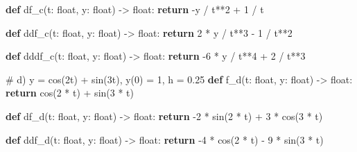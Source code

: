 \documentclass[
  letterpaper,
  DIV=11,
  numbers=noendperiod]{scrartcl}
\newenvironment{Shaded}{\begin{snugshade}}{\end{snugshade}}
\newcommand{\BuiltInTok}[1]{\textcolor[rgb]{0.00,0.23,0.31}{#1}}
\newcommand{\CommentTok}[1]{\textcolor[rgb]{0.37,0.37,0.37}{#1}}
\newcommand{\ControlFlowTok}[1]{\textcolor[rgb]{0.00,0.23,0.31}{\textbf{#1}}}
\newcommand{\DecValTok}[1]{\textcolor[rgb]{0.68,0.00,0.00}{#1}}
\newcommand{\KeywordTok}[1]{\textcolor[rgb]{0.00,0.23,0.31}{\textbf{#1}}}
\newcommand{\NormalTok}[1]{\textcolor[rgb]{0.00,0.23,0.31}{#1}}
\newcommand{\OperatorTok}[1]{\textcolor[rgb]{0.37,0.37,0.37}{#1}}
\begin{document}
\begin{Shaded}
\begin{Highlighting}[]
\KeywordTok{def}\NormalTok{ df\_c(t: }\BuiltInTok{float}\NormalTok{, y: }\BuiltInTok{float}\NormalTok{) }\OperatorTok{{-}\textgreater{}} \BuiltInTok{float}\NormalTok{:}
    \ControlFlowTok{return} \OperatorTok{{-}}\NormalTok{y }\OperatorTok{/}\NormalTok{ t}\OperatorTok{**}\DecValTok{2} \OperatorTok{+} \DecValTok{1} \OperatorTok{/}\NormalTok{ t}

\KeywordTok{def}\NormalTok{ ddf\_c(t: }\BuiltInTok{float}\NormalTok{, y: }\BuiltInTok{float}\NormalTok{) }\OperatorTok{{-}\textgreater{}} \BuiltInTok{float}\NormalTok{:}
    \ControlFlowTok{return} \DecValTok{2} \OperatorTok{*}\NormalTok{ y }\OperatorTok{/}\NormalTok{ t}\OperatorTok{**}\DecValTok{3} \OperatorTok{{-}} \DecValTok{1} \OperatorTok{/}\NormalTok{ t}\OperatorTok{**}\DecValTok{2}

\KeywordTok{def}\NormalTok{ dddf\_c(t: }\BuiltInTok{float}\NormalTok{, y: }\BuiltInTok{float}\NormalTok{) }\OperatorTok{{-}\textgreater{}} \BuiltInTok{float}\NormalTok{:}
    \ControlFlowTok{return} \OperatorTok{{-}}\DecValTok{6} \OperatorTok{*}\NormalTok{ y }\OperatorTok{/}\NormalTok{ t}\OperatorTok{**}\DecValTok{4} \OperatorTok{+} \DecValTok{2} \OperatorTok{/}\NormalTok{ t}\OperatorTok{**}\DecValTok{3}


\CommentTok{\# d) y\textquotesingle{} = cos(2t) + sin(3t), y(0) = 1, h = 0.25}
\KeywordTok{def}\NormalTok{ f\_d(t: }\BuiltInTok{float}\NormalTok{, y: }\BuiltInTok{float}\NormalTok{) }\OperatorTok{{-}\textgreater{}} \BuiltInTok{float}\NormalTok{:}
    \ControlFlowTok{return}\NormalTok{ cos(}\DecValTok{2} \OperatorTok{*}\NormalTok{ t) }\OperatorTok{+}\NormalTok{ sin(}\DecValTok{3} \OperatorTok{*}\NormalTok{ t)}

\KeywordTok{def}\NormalTok{ df\_d(t: }\BuiltInTok{float}\NormalTok{, y: }\BuiltInTok{float}\NormalTok{) }\OperatorTok{{-}\textgreater{}} \BuiltInTok{float}\NormalTok{:}
    \ControlFlowTok{return} \OperatorTok{{-}}\DecValTok{2} \OperatorTok{*}\NormalTok{ sin(}\DecValTok{2} \OperatorTok{*}\NormalTok{ t) }\OperatorTok{+} \DecValTok{3} \OperatorTok{*}\NormalTok{ cos(}\DecValTok{3} \OperatorTok{*}\NormalTok{ t)}

\KeywordTok{def}\NormalTok{ ddf\_d(t: }\BuiltInTok{float}\NormalTok{, y: }\BuiltInTok{float}\NormalTok{) }\OperatorTok{{-}\textgreater{}} \BuiltInTok{float}\NormalTok{:}
    \ControlFlowTok{return} \OperatorTok{{-}}\DecValTok{4} \OperatorTok{*}\NormalTok{ cos(}\DecValTok{2} \OperatorTok{*}\NormalTok{ t) }\OperatorTok{{-}} \DecValTok{9} \OperatorTok{*}\NormalTok{ sin(}\DecValTok{3} \OperatorTok{*}\NormalTok{ t)}


\end{Highlighting}
\end{Shaded}
\end{document}
